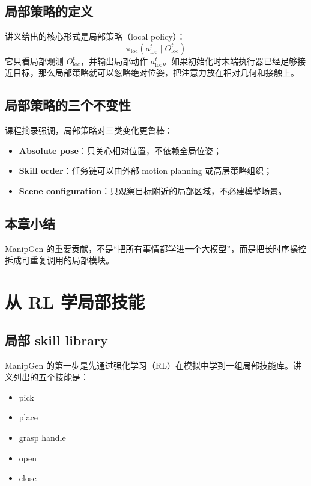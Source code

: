 \documentclass[a4paper]{article}
\begin{document}
\subsection{局部策略的定义}

讲义给出的核心形式是局部策略（local policy）：
\[
\pi_{\mathrm{loc}}(a^{t}_{\mathrm{loc}} \mid O^{t}_{\mathrm{loc}})
\]
它只看局部观测 \(O^{t}_{\mathrm{loc}}\)，并输出局部动作 \(a^{t}_{\mathrm{loc}}\)。如果初始化时末端执行器已经足够接近目标，那么局部策略就可以忽略绝对位姿，把注意力放在相对几何和接触上。

\subsection{局部策略的三个不变性}

课程摘录强调，局部策略对三类变化更鲁棒：
\begin{itemize}
  \item \textbf{Absolute pose}：只关心相对位置，不依赖全局位姿；
  \item \textbf{Skill order}：任务链可以由外部 motion planning 或高层策略组织；
  \item \textbf{Scene configuration}：只观察目标附近的局部区域，不必建模整场景。
\end{itemize}

\subsection{本章小结}

ManipGen 的重要贡献，不是“把所有事情都学进一个大模型”，而是把长时序操控拆成可重复调用的局部模块。

\section{从 RL 学局部技能}

\subsection{局部 skill library}

ManipGen 的第一步是先通过强化学习（RL）在模拟中学到一组局部技能库。讲义列出的五个技能是：
\begin{itemize}
  \item pick
  \item place
  \item grasp handle
  \item open
  \item close
\end{itemize}
\end{document}
